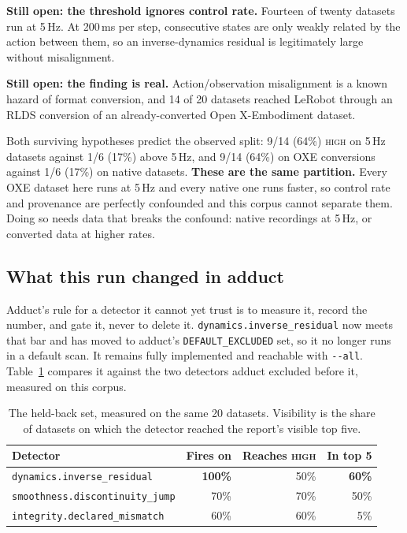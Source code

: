\documentclass[10pt,a4paper]{article}
\newcommand{\dtr}[1]{\texttt{\small #1}}
\newcommand{\warn}[1]{\textcolor{critical}{\textbf{#1}}}
\begin{document}
\textbf{Still open: the threshold ignores control rate.} Fourteen of twenty datasets run at
5\,Hz. At 200\,ms per step, consecutive states are only weakly related by the action between
them, so an inverse-dynamics residual is legitimately large without misalignment.

\textbf{Still open: the finding is real.} Action/observation misalignment is a known hazard
of format conversion, and 14 of 20 datasets reached LeRobot through an RLDS conversion of an
already-converted Open X-Embodiment dataset.

Both surviving hypotheses predict the observed split: 9/14 (64\%) \textsc{high} on 5\,Hz
datasets against 1/6 (17\%) above 5\,Hz, and 9/14 (64\%) on OXE conversions against 1/6
(17\%) on native datasets. \textbf{These are the same partition.} Every OXE dataset here
runs at 5\,Hz and every native one runs faster, so control rate and provenance are perfectly
confounded and this corpus cannot separate them. Doing so needs data that breaks the
confound: native recordings at 5\,Hz, or converted data at higher rates.

\subsection{What this run changed in adduct}
\label{sec:decided}

Adduct's rule for a detector it cannot yet trust is to measure it, record the number, and
gate it, never to delete it. \dtr{dynamics.inverse\_residual} now meets that bar and has
moved to adduct's \texttt{DEFAULT\_EXCLUDED} set, so it no longer runs in a default scan. It
remains fully implemented and reachable with \texttt{-{}-all}. Table~\ref{tab:excluded}
compares it against the two detectors adduct excluded before it, measured on this corpus.

\begin{table}[tb]
\centering
\caption{The held-back set, measured on the same 20 datasets. Visibility is the share of
datasets on which the detector reached the report's visible top five.}
\label{tab:excluded}
\small
\begin{tabular}{lrrr}
\toprule
Detector & Fires on & Reaches \textsc{high} & In top 5 \\
\midrule
\dtr{dynamics.inverse\_residual}      & \warn{100\%} & 50\% & \warn{60\%} \\
\dtr{smoothness.discontinuity\_jump}  & 70\% & 70\% & 50\% \\
\dtr{integrity.declared\_mismatch}    & 60\% & 60\% & 5\% \\
\bottomrule
\end{tabular}
\end{table}
\end{document}
